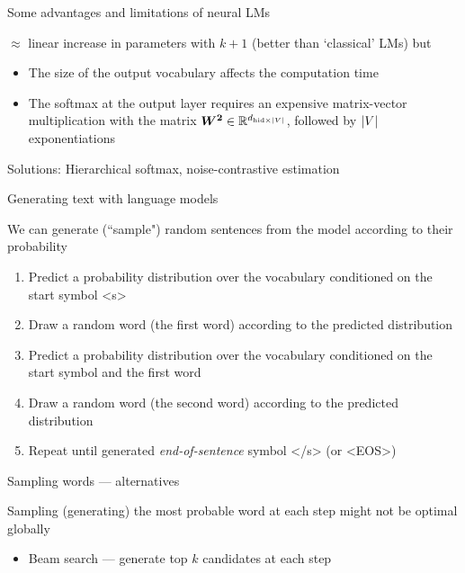 \documentclass[12pt,aspectratio=169,handout]{beamer}
\begin{document}
\begin{frame}{Some advantages and limitations of neural LMs}

$\approx$ linear increase in parameters with $k + 1$ (better than `classical' LMs) but
\begin{itemize}
	\item The size of the output vocabulary affects the computation time
	\item The softmax at the output layer requires an expensive matrix-vector multiplication with the matrix $\bm{W^2} \in \mathbb{R}^{d_{\text{hid} \times \abs{V}}}$, followed by $\abs{V}$ exponentiations
\end{itemize}

Solutions: Hierarchical softmax, noise-contrastive estimation

\end{frame}

\begin{frame}{Generating text with language models}

We can generate (``sample") random sentences from the model according to their probability

\begin{enumerate}
	\item Predict a probability distribution over the vocabulary conditioned on the start symbol <s>
	\item Draw a random word (the first word) according to the predicted distribution
	\item Predict a probability distribution over the vocabulary conditioned on the start symbol and the first word
	\item Draw a random word (the second word) according to the predicted distribution
	\item Repeat until generated \emph{end-of-sentence} symbol </s> (or <EOS>)
\end{enumerate}


\end{frame}

\begin{frame}{Sampling words --- alternatives}
	
Sampling (generating) the most probable word at each step might not be optimal globally

\begin{itemize}
	\item Beam search --- generate top $k$ candidates at each step
\end{itemize}
	
\end{frame}
\end{document}
